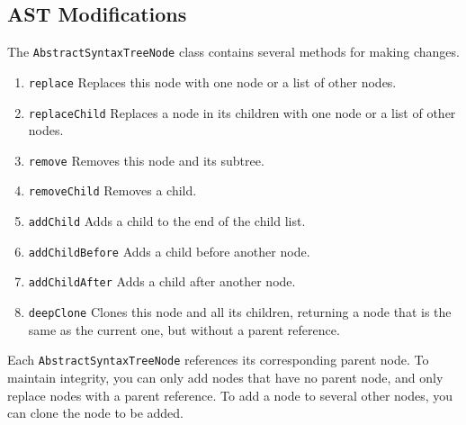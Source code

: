 \subsection{AST Modifications}

The \verb|AbstractSyntaxTreeNode| class contains several methods for making changes.

\begin{enumerate}
\item \verb|replace|  Replaces this node with one node or a list of other nodes.
\item \verb|replaceChild|  Replaces a node in its children with one node or a list of other nodes.
\item \verb|remove| Removes this node and its subtree.
\item \verb|removeChild| Removes a child.
\item \verb|addChild| Adds a child to the end of the child list.
\item \verb|addChildBefore| Adds a child before another node.
\item \verb|addChildAfter| Adds a child after another node.
\item \verb|deepClone| Clones this node and all its children, returning a node that is the same as the current one, but without a parent reference.
\end{enumerate}

Each \verb|AbstractSyntaxTreeNode| references its corresponding parent node. 
To maintain integrity, you can only add nodes that have no parent node, and only replace nodes with a parent reference. 
To add a node to several other nodes, you can clone the node to be added.